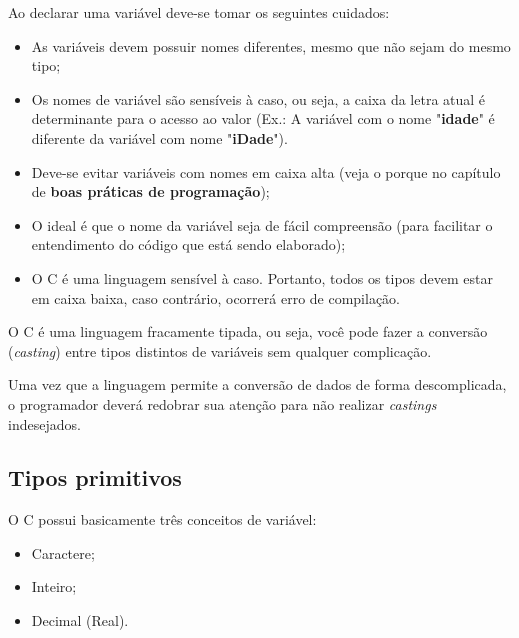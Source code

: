 \documentclass[12pt]{article}
\newcommand\tab[1][1cm]{\hspace*{#1}}
\begin{document}
\hspace{0.25cm}
\begin{tcolorbox}[colback=yellow!5!white,colframe=yellow!75!black,title=Atenção!]
  \par\tab Ao declarar uma variável deve-se tomar os seguintes cuidados:
  \begin{itemize}
      \item As variáveis devem possuir nomes diferentes, mesmo que não sejam do mesmo tipo;
      \item Os nomes de variável são sensíveis à caso, ou seja, a caixa da letra atual é determinante para o acesso ao valor (Ex.: A variável com o nome "\textbf{idade}" é diferente da variável com nome "\textbf{iDade}"). 
      \item Deve-se evitar variáveis com nomes em caixa alta (veja o porque no capítulo de \textbf{boas práticas de programação});
      \item O ideal é que o nome da variável seja de fácil compreensão (para facilitar o entendimento do código que está sendo elaborado);
      \item O C é uma linguagem sensível à caso. Portanto, todos os tipos devem estar em caixa baixa, caso contrário, ocorrerá erro de compilação.
  \end{itemize}
\end{tcolorbox}

\hspace{0.25cm}
\par\tab O C é uma linguagem fracamente tipada, ou seja, você pode fazer a conversão (\textit{casting}) entre tipos distintos de variáveis sem qualquer complicação.

\hspace{0.25cm}
\begin{tcolorbox}[colback=red!5!white,colframe=red!75!black,title=Cuidado!]
  \par\tab Uma vez que a linguagem permite a conversão de dados de forma descomplicada, o programador deverá redobrar sua atenção para não realizar \textit{castings} indesejados.
\end{tcolorbox}

\subsection{Tipos primitivos}

\par\tab O C possui basicamente três conceitos de variável:
\begin{itemize}
    \item Caractere;
    \item Inteiro;
    \item Decimal (Real).
\end{itemize}
\end{document}
